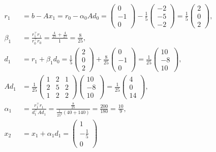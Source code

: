 \documentclass[english, parskip=full]{scrartcl}
\begin{document}
\begin{align}
r_1 &= b - Ax_1 = r_0 - \alpha_0Ad_0 = \begin{pmatrix}
0 \\ -1 \\ 0
\end{pmatrix} - \frac{1}{5}\begin{pmatrix}
-2 \\ -5 \\ -2
\end{pmatrix} = \frac{1}{5}\begin{pmatrix}
2 \\ 0 \\ 2
\end{pmatrix},\\
\beta_1 &= \frac{r_1^\top r_1}{r_0^\top r_0} = \frac{\frac{4}{25} + \frac{4}{25}}{1} = \frac{8}{25},\\
d_1 &= r_1 + \beta_1d_0 = \frac{1}{5}\begin{pmatrix}
2 \\ 0 \\ 2
\end{pmatrix} + \frac{8}{25}\begin{pmatrix}
0 \\ -1 \\ 0
\end{pmatrix} = \frac{1}{25}\begin{pmatrix}
10 \\ -8 \\ 10
\end{pmatrix},\\
Ad_1 &= \frac{1}{25}\begin{pmatrix}
1 & 2 & 1 \\ 2 & 5 & 2 \\ 1 & 2 & 2
\end{pmatrix} \begin{pmatrix}
10 \\ -8 \\ 10
\end{pmatrix} = \frac{1}{25} \begin{pmatrix}
4 \\ 0 \\ 14
\end{pmatrix},\\
\alpha_1 &= \frac{r_1^\top r_1}{d_1^\top Ad_1} = \frac{\frac{8}{25}}{\frac{1}{25^2}(40 + 140)} = \frac{200}{180} = \frac{10}{9},\\
x_2 &= x_1 + \alpha_1d_1 = \begin{pmatrix}
1 \\ -\frac{1}{5} \\ 0

\end{pmatrix}
\end{align}
\end{document}
